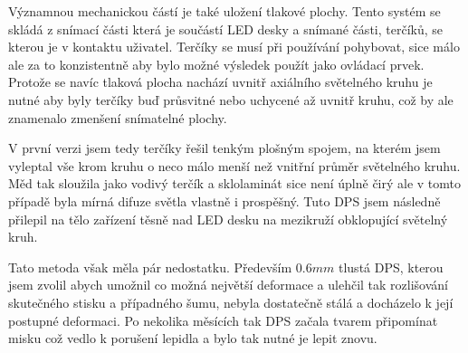 Významnou mechanickou částí je také uložení tlakové plochy.
Tento systém se skládá z snímací části která je součástí LED desky a snímané části, terčíků, se kterou je v kontaktu uživatel.
Terčíky se musí při používání pohybovat, sice málo ale za to konzistentně aby bylo možné výsledek použít jako ovládací prvek.
Protože se navíc tlaková plocha nachází uvnitř axiálního světelného kruhu je nutné aby byly terčíky buď průsvitné nebo uchycené až uvnitř kruhu, což by ale znamenalo zmenšení snímatelné plochy.

V první verzi jsem tedy terčíky řešil tenkým plošným spojem, na kterém jsem vyleptal vše krom kruhu o neco málo menší než vnitřní průměr světelného kruhu.
Měd tak sloužila jako vodivý terčík a sklolaminát sice není úplně čirý ale v tomto případě byla mírná difuze světla vlastně i prospěšný.
Tuto DPS jsem následně přilepil na tělo zařízení těsně nad LED desku na mezikruží obklopující světelný kruh.

Tato metoda však měla pár nedostatku.
Především \(0.6 mm\) tlustá DPS, kterou jsem zvolil abych umožnil co možná největší deformace a ulehčil tak rozlišování skutečného stisku a případného šumu, nebyla dostatečně stálá a docházelo k její postupné deformaci.
Po nekolika měsících tak DPS začala tvarem připomínat misku což vedlo k porušení lepidla a bylo tak nutné je lepit znovu.






